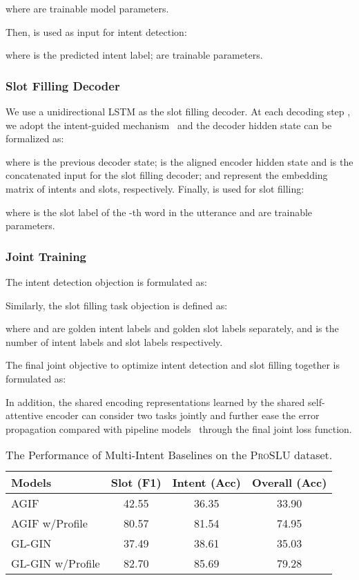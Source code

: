 \documentclass[letterpaper]{article} \usepackage{aaai22}  \usepackage{times}  \usepackage{helvet}  \usepackage{courier}  \usepackage[hyphens]{url}  \usepackage{graphicx} \urlstyle{rm} \def\UrlFont{\rm}  \usepackage{natbib}  \usepackage{caption} \DeclareCaptionStyle{ruled}{labelfont=normalfont,labelsep=colon,strut=off} \frenchspacing  \setlength{\pdfpagewidth}{8.5in}  \setlength{\pdfpageheight}{11in}  \usepackage{algorithm}
\begin{document}
where  are trainable model parameters.

Then,  is used as input for intent detection:

where  is the predicted intent label;  are trainable parameters. 

\subsubsection{Slot Filling Decoder}
We use a unidirectional LSTM as the slot filling decoder.
At each decoding step , we adopt the intent-guided mechanism~\citep{qin-etal-2019-stack} and the decoder hidden state   can be formalized as:

where  is the previous decoder state;
 is the aligned encoder hidden state
and  is the concatenated input for the slot filling decoder;  and  represent the embedding matrix of intents and slots, respectively. 
Finally,  is used for slot filling:

where  is the slot label of the -th word in the utterance and  are trainable parameters.

\subsubsection{Joint Training}
The intent detection objection is formulated as:


Similarly, the slot filling task objection is defined as: 

where  and  are golden intent labels and golden slot labels separately,  and  is the number of intent labels and slot labels respectively.

The final joint objective to optimize intent detection and slot filling together is formulated as:


In addition, the shared encoding representations learned by the shared self-attentive encoder can consider two tasks jointly and further ease the error propagation compared with pipeline models~\citep{zhang2016joint} through the final joint loss function. 

\begin{table}[h]
	\centering
	\begin{adjustbox}{width=0.47\textwidth}
		\begin{tabular}{lccc}
			\toprule
            \textbf{Models}
			& \textbf{Slot (F1)}  & \textbf{Intent (Acc)}   & \textbf{Overall (Acc)} \\ 
            \midrule
			AGIF~\citep{qin-etal-2020-agif} & 42.55 & 36.35 & 33.90 \\
			AGIF w/Profile & 80.57 & 81.54 & 74.95 \\
            \midrule
            GL-GIN~\citep{qin-etal-2021-gl} & 37.49 & 38.61 & 35.03\\
			GL-GIN w/Profile & 82.70 & 85.69 & 79.28 \\
            \bottomrule
		\end{tabular}
	\end{adjustbox}
	\caption{
        The Performance of Multi-Intent Baselines on the \textsc{ProSLU} dataset.
    }
	\label{tab:results-multi}
\end{table}
\end{document}
